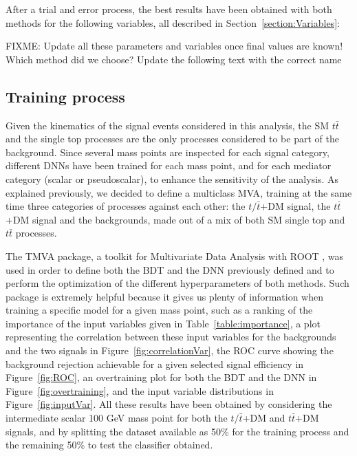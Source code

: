 \documentclass[a4paper, 10pt, openright]{report}
\begin{document}
After a trial and error process, the best results have been obtained with both methods for the following variables, all described in Section~\ref{section:Variables}: 

\color{red}FIXME: Update all these parameters and variables once final values are known! Which method did we choose? Update the following text with the correct name \color{black}

\subsection{Training process}


Given the kinematics of the signal events considered in this analysis, the \ac{SM} $t \bar t$ and the single top processes are the only processes considered to be part of the background. Since several mass points are inspected for each signal category, different \acp{DNN} have been trained for each mass point, and for each mediator category (scalar or pseudoscalar), to enhance the sensitivity of the analysis. As explained previously, we decided to define a multiclass \ac{MVA}, training at the same time three categories of processes against each other: the $t/\bar t$+DM signal, the $t \bar t$+DM signal and the backgrounds, made out of a mix of both \ac{SM} single top and $t \bar t$ processes.

The TMVA package, a toolkit for Multivariate Data Analysis with ROOT \cite{TMVA}, was used in order to define both the \ac{BDT} and the \ac{DNN} previously defined and to perform the optimization of the different hyperparameters of both methods. Such package is extremely helpful because it gives us plenty of information when training a specific model for a given mass point, such as a ranking of the importance of the input variables given in Table~\ref{table:importance}, a plot representing the correlation between these input variables for the backgrounds and the two signals in Figure~\ref{fig:correlationVar}, the \ac{ROC} curve showing the background rejection achievable for a given selected signal efficiency in Figure~\ref{fig:ROC}, an overtraining plot for both the \ac{BDT} and the \ac{DNN} in Figure~\ref{fig:overtraining}, and the input variable distributions in Figure~\ref{fig:inputVar}. All these results have been obtained by considering the intermediate scalar 100 GeV mass point for both the $t/\bar t$+DM and $t \bar t$+DM signals, and by splitting the dataset available as 50\% for the training process and the remaining 50\% to test the classifier obtained. 
\end{document}
